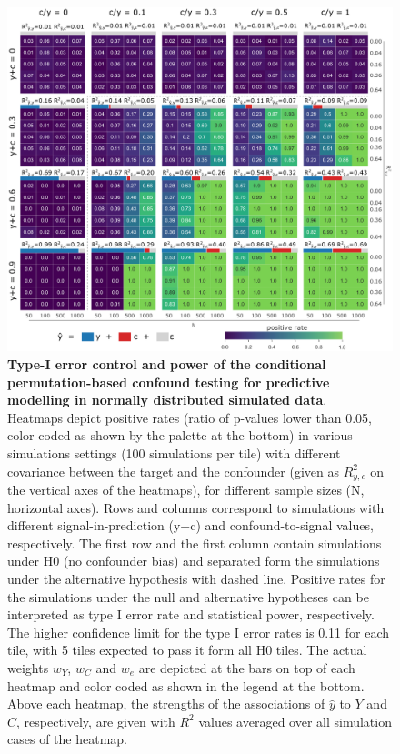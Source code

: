 \documentclass{article}
\begin{document}
\begin{figure}[!b]
  \centering
  \includegraphics[width=0.75\paperwidth]{fig/sim_normal.eps}
  \caption{\textbf{Type-I error control and power of the conditional permutation-based confound testing for predictive modelling in normally distributed simulated data}. \\
  Heatmaps depict positive rates (ratio of p-values lower than 0.05, color coded as shown by the palette at the bottom) in various simulations settings (100 simulations per tile) with different covariance between the target and the confounder (given as $R^2_{y,c}$ on the vertical axes of the heatmaps), for different sample sizes (N, horizontal axes).
  Rows and columns correspond to simulations with different signal-in-prediction (y+c) and confound-to-signal values, respectively. The first row and the first column contain simulations under H0 (no confounder bias) and separated form the simulations under the alternative hypothesis with dashed line. Positive rates for the simulations under the null and alternative hypotheses can be interpreted as type I error rate and statistical power, respectively. The higher confidence limit for the type I error rates is 0.11 for each tile, with 5 tiles expected to pass it form all H0 tiles.
  The actual weights $w_{Y}$, $w_{C}$ and $w_{e}$ are depicted at the bars on top of each heatmap and color coded as shown in the legend at the bottom. Above each heatmap, the strengths of the associations of $\hat{y}$ to $Y$ and $C$, respectively, are given with $R^2$ values averaged over all simulation cases of the heatmap.
  }
  \label{fig:sim-normal}
\end{figure}
\end{document}
